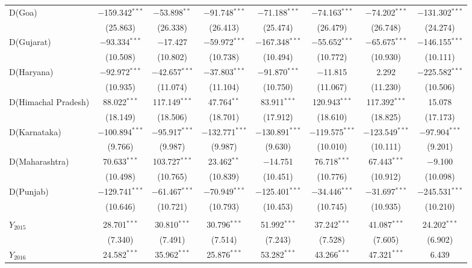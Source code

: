 \documentclass[12pt,a4paper]{article}
\begin{document}
\begin{table}[!ht]
{\begin{tabular}{lccccccc}
				D(Goa) & $-$159.342$^{***}$ & $-$53.898$^{**}$ & $-$91.748$^{***}$ & $-$71.188$^{***}$ & $-$74.163$^{***}$ & $-$74.202$^{***}$ & $-$131.302$^{***}$ \\ 
				& (25.863) & (26.338) & (26.413) & (25.474) & (26.479) & (26.748) & (24.274) \\ 
				D(Gujarat) & $-$93.334$^{***}$ & $-$17.427 & $-$59.972$^{***}$ & $-$167.348$^{***}$ & $-$55.652$^{***}$ & $-$65.675$^{***}$ & $-$146.155$^{***}$ \\ 
				& (10.508) & (10.802) & (10.738) & (10.494) & (10.772) & (10.930) & (10.111) \\ 
				D(Haryana) & $-$92.972$^{***}$ & $-$42.657$^{***}$ & $-$37.803$^{***}$ & $-$91.870$^{***}$ & $-$11.815 & 2.292 & $-$225.582$^{***}$ \\ 
				& (10.935) & (11.074) & (11.104) & (10.750) & (11.067) & (11.230) & (10.506) \\ 
				D(Himachal Pradesh) & 88.022$^{***}$ & 117.149$^{***}$ & 47.764$^{**}$ & 83.911$^{***}$ & 120.943$^{***}$ & 117.392$^{***}$ & 15.078 \\ 
				& (18.149) & (18.506) & (18.701) & (17.912) & (18.610) & (18.825) & (17.173) \\ 
				D(Karnataka) & $-$100.894$^{***}$ & $-$95.917$^{***}$ & $-$132.771$^{***}$ & $-$130.891$^{***}$ & $-$119.575$^{***}$ & $-$123.549$^{***}$ & $-$97.904$^{***}$ \\ 
				& (9.766) & (9.987) & (9.987) & (9.630) & (10.010) & (10.111) & (9.201) \\ 
				D(Maharashtra) & 70.633$^{***}$ & 103.727$^{***}$ & 23.462$^{**}$ & $-$14.751 & 76.718$^{***}$ & 67.443$^{***}$ & $-$9.100 \\ 
				& (10.498) & (10.765) & (10.839) & (10.451) & (10.776) & (10.912) & (10.098) \\ 
				D(Punjab) & $-$129.741$^{***}$ & $-$61.467$^{***}$ & $-$70.949$^{***}$ & $-$125.401$^{***}$ & $-$34.446$^{***}$ & $-$31.697$^{***}$ & $-$245.531$^{***}$ \\ 
				& (10.646) & (10.721) & (10.793) & (10.453) & (10.745) & (10.935) & (10.210) \\ \hline
				& & & & & & & \\
				$Y_{2015}$ & 28.701$^{***}$ & 30.810$^{***}$ & 30.796$^{***}$ & 51.992$^{***}$ & 37.242$^{***}$ & 41.087$^{***}$ & 24.202$^{***}$ \\ 
				& (7.340) & (7.491) & (7.514) & (7.243) & (7.528) & (7.605) & (6.902) \\ 
				$Y_{2016}$ & 24.582$^{***}$ & 35.962$^{***}$ & 25.876$^{***}$ & 53.282$^{***}$ & 43.266$^{***}$ & 47.321$^{***}$ & 6.439 \\ 

\end{tabular}}
\end{table}
\end{document}
